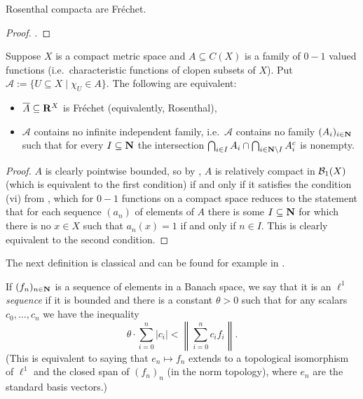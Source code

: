 	\begin{fct}\label{fct: Rosnthal implies Frechet}
		Rosenthal compacta are Fréchet.
	\end{fct}
	\begin{proof}
		\cite[Theorem 4.1]{Debs14}.
	\end{proof}
	
	
	
	\begin{fct}
		\label{fct:bft}
		Suppose $X$ is a compact metric space and $A\subseteq C(X)$ is a family of $0-1$ valued functions (i.e.\ characteristic functions of clopen subsets of $X$). Put $\mathcal A:=\{U\subseteq X\mid \chi_U\in A \}$. The following are equivalent:
		\begin{itemize}
			\item
			$\overline A\subseteq {{\mathbf{R}}}^X$ is Fréchet (equivalently, Rosenthal),
			\item
			$\mathcal A$ contains no infinite independent family, i.e.\ $\mathcal A$ contains no family $(A_i)_{i \in {\mathbf{N}}}$ such that for every $I \subseteq {\mathbf{N}}$ the intersection $\bigcap_{i \in I} A_i \cap \bigcap_{i \in {\mathbf{N}} \setminus I} A_i^c$ is nonempty.
		\end{itemize}
	\end{fct}
	\begin{proof}
		$A$ is clearly pointwise bounded, so by \cite[Corollary 4G]{BFT78}, $A$ is relatively compact in ${\mathcal B}_1(X)$ (which is equivalent to the first condition) if and only if it satisfies the condition (vi) from \cite[Theorem 2F]{BFT78}, which for $0-1$ functions on a compact space reduces to the statement that for each sequence $(a_n)$ of elements of $A$ there is some $I\subseteq {\mathbf{N}}$ for which there is no $x\in X$ such that $a_n(x)=1$ if and only if $n\in I$.
		This is clearly equivalent to the second condition.
	\end{proof}
	
	The next definition is classical and can be found for example in \cite[Section 5]{Koh95}.
	\begin{dfn}
		If $(f_n)_{n\in {{\mathbf{N}}}}$ is a sequence of elements in a Banach space, we say that it is an {\em $\ell^1$ sequence} if it is bounded and there is a constant $\theta>0$ such that for any scalars $c_0,\ldots,c_n$ we have the inequality
		\[
		\theta\cdot \sum_{i=0}^n \lvert c_i\rvert < \left \lVert \sum_{i=0}^n c_i f_i\right\rVert.
		\]
		(This is equivalent to saying that $e_n\mapsto f_n$ extends to a topological isomorphism of $\ell^1$ and the closed span of $(f_n)_n$ (in the norm topology), where $e_n$ are the standard basis vectors.)
		\xqed{\lozenge}
	\end{dfn}
	
